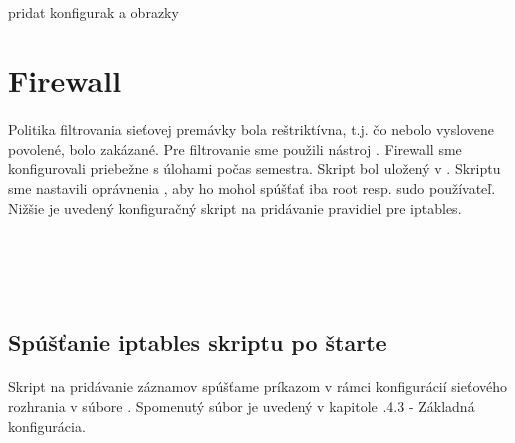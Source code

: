 \paragraph{}
pridat konfigurak a obrazky

\section{Firewall}
\paragraph{}
Politika filtrovania sieťovej premávky bola reštriktívna, t.j. čo nebolo vyslovene povolené, bolo zakázané. Pre filtrovanie sme použili nástroj . Firewall sme konfigurovali priebežne s úlohami počas semestra. Skript bol uložený v . Skriptu sme nastavili oprávnenia , aby ho mohol spúšťať iba root resp. sudo používateľ. Nižšie je uvedený konfiguračný skript na pridávanie pravidiel pre iptables.

\noindent
{\selectfont
\\

\begin{small}

\begin{verbatim}



\end{verbatim}

\end{small}

}

\subsection{Spúšťanie iptables skriptu po štarte}
\paragraph{}
Skript na pridávanie záznamov  spúšťame príkazom  v rámci konfigurácií sieťového rozhrania  v súbore . Spomenutý súbor je uvedený v kapitole \say.{4.3 - Základná konfigurácia}.
